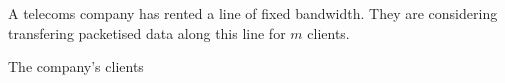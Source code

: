 \documentclass[12pt,fleqn]{article}
\begin{document}
\vspace{10mm}
\begin{exam}

\bigskip


\begin{question}
\begin{qupart}
\end{qupart}

\begin{qupart}
\end{qupart}

\begin{qupart}
\end{qupart}

\begin{qupart}
\end{qupart}

\end{question}

\begin{question}
A telecoms company has rented a line of fixed bandwidth. They are considering transfering packetised data along this line for $m$ clients. 

\begin{qupart}
The company's clients 
\end{qupart}

\begin{qupart}
\end{qupart}

\begin{qupart}
\end{qupart}

\begin{qupart}
\end{qupart}

\end{question}



\end{exam}
\end{document}

